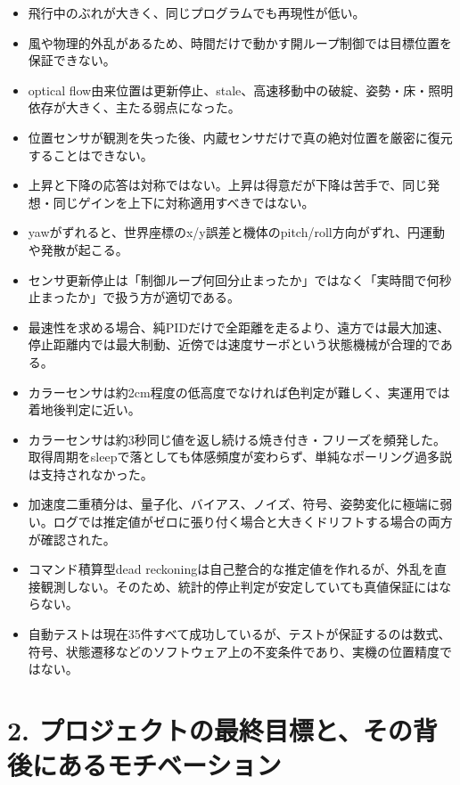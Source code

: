 \documentclass[10pt,a4paper,openany]{ltjsbook}
\begin{document}
\begin{itemize}
\item 飛行中のぶれが大きく、同じプログラムでも再現性が低い。
\item 風や物理的外乱があるため、時間だけで動かす開ループ制御では目標位置を保証できない。
\item optical flow由来位置は更新停止、stale、高速移動中の破綻、姿勢・床・照明依存が大きく、主たる弱点になった。
\item 位置センサが観測を失った後、内蔵センサだけで真の絶対位置を厳密に復元することはできない。
\item 上昇と下降の応答は対称ではない。上昇は得意だが下降は苦手で、同じ発想・同じゲインを上下に対称適用すべきではない。
\item yawがずれると、世界座標のx/y誤差と機体のpitch/roll方向がずれ、円運動や発散が起こる。
\item センサ更新停止は「制御ループ何回分止まったか」ではなく「実時間で何秒止まったか」で扱う方が適切である。
\item 最速性を求める場合、純PIDだけで全距離を走るより、遠方では最大加速、停止距離内では最大制動、近傍では速度サーボという状態機械が合理的である。
\item カラーセンサは約2cm程度の低高度でなければ色判定が難しく、実運用では着地後判定に近い。
\item カラーセンサは約3秒同じ値を返し続ける焼き付き・フリーズを頻発した。取得周期をsleepで落としても体感頻度が変わらず、単純なポーリング過多説は支持されなかった。
\item 加速度二重積分は、量子化、バイアス、ノイズ、符号、姿勢変化に極端に弱い。ログでは推定値がゼロに張り付く場合と大きくドリフトする場合の両方が確認された。
\item コマンド積算型dead reckoningは自己整合的な推定値を作れるが、外乱を直接観測しない。そのため、統計的停止判定が安定していても真値保証にはならない。
\item 自動テストは現在35件すべて成功しているが、テストが保証するのは数式、符号、状態遷移などのソフトウェア上の不変条件であり、実機の位置精度ではない。
\end{itemize}
\vspace{0.3em}{\noindent\color{ReportLight}\rule{\linewidth}{0.8pt}}\vspace{0.3em}
\chapter{2. プロジェクトの最終目標と、その背後にあるモチベーション}
\end{document}
